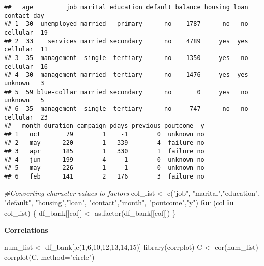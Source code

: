 \documentclass[
]{article}
\newenvironment{Shaded}{\begin{snugshade}}{\end{snugshade}}
\newcommand{\AttributeTok}[1]{\textcolor[rgb]{0.77,0.63,0.00}{#1}}
\newcommand{\CommentTok}[1]{\textcolor[rgb]{0.56,0.35,0.01}{\textit{#1}}}
\newcommand{\ControlFlowTok}[1]{\textcolor[rgb]{0.13,0.29,0.53}{\textbf{#1}}}
\newcommand{\DecValTok}[1]{\textcolor[rgb]{0.00,0.00,0.81}{#1}}
\newcommand{\FunctionTok}[1]{\textcolor[rgb]{0.00,0.00,0.00}{#1}}
\newcommand{\NormalTok}[1]{#1}
\newcommand{\OtherTok}[1]{\textcolor[rgb]{0.56,0.35,0.01}{#1}}
\newcommand{\StringTok}[1]{\textcolor[rgb]{0.31,0.60,0.02}{#1}}
\begin{document}
\begin{verbatim}
##   age         job marital education default balance housing loan  contact day
## 1  30  unemployed married   primary      no    1787      no   no cellular  19
## 2  33    services married secondary      no    4789     yes  yes cellular  11
## 3  35  management  single  tertiary      no    1350     yes   no cellular  16
## 4  30  management married  tertiary      no    1476     yes  yes  unknown   3
## 5  59 blue-collar married secondary      no       0     yes   no  unknown   5
## 6  35  management  single  tertiary      no     747      no   no cellular  23
##   month duration campaign pdays previous poutcome  y
## 1   oct       79        1    -1        0  unknown no
## 2   may      220        1   339        4  failure no
## 3   apr      185        1   330        1  failure no
## 4   jun      199        4    -1        0  unknown no
## 5   may      226        1    -1        0  unknown no
## 6   feb      141        2   176        3  failure no
\end{verbatim}

\begin{Shaded}
\begin{Highlighting}[]
\CommentTok{\#Converting character values to factors}
\NormalTok{col\_list }\OtherTok{\textless{}{-}} \FunctionTok{c}\NormalTok{(}\StringTok{"job"}\NormalTok{, }\StringTok{"marital"}\NormalTok{,}\StringTok{"education"}\NormalTok{, }\StringTok{"default"}\NormalTok{, }\StringTok{"housing"}\NormalTok{,}\StringTok{"loan"}\NormalTok{, }
              \StringTok{"contact"}\NormalTok{,}\StringTok{"month"}\NormalTok{, }\StringTok{"poutcome"}\NormalTok{,}\StringTok{"y"}\NormalTok{)}
\ControlFlowTok{for}\NormalTok{ (col }\ControlFlowTok{in}\NormalTok{ col\_list) \{}
\NormalTok{  df\_bank[[col]] }\OtherTok{\textless{}{-}} \FunctionTok{as.factor}\NormalTok{(df\_bank[[col]])}
\NormalTok{\}}
\end{Highlighting}
\end{Shaded}

\textbf{Correlations}

\begin{Shaded}
\begin{Highlighting}[]
\NormalTok{num\_list }\OtherTok{\textless{}{-}}\NormalTok{ df\_bank[,}\FunctionTok{c}\NormalTok{(}\DecValTok{1}\NormalTok{,}\DecValTok{6}\NormalTok{,}\DecValTok{10}\NormalTok{,}\DecValTok{12}\NormalTok{,}\DecValTok{13}\NormalTok{,}\DecValTok{14}\NormalTok{,}\DecValTok{15}\NormalTok{)]}
\FunctionTok{library}\NormalTok{(corrplot)}
\NormalTok{C }\OtherTok{\textless{}{-}} \FunctionTok{cor}\NormalTok{(num\_list)}
\FunctionTok{corrplot}\NormalTok{(C, }\AttributeTok{method=}\StringTok{"circle"}\NormalTok{)}
\end{Highlighting}
\end{Shaded}
\end{document}
